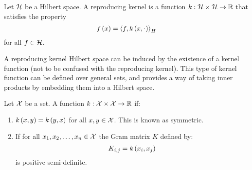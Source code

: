 \documentclass[12pt]{article}
\begin{document}
\begin{definition}
  Let \(\mathcal{H}\) be a Hilbert space.
  A reproducing kernel is a function
  \(k : \mathcal{H} \times \mathcal{H} \to \mathbb{R}\)
  that satisfies the property
  \begin{align*}
    f\left(x\right) = \left\langle f, k\left(x, \cdot\right)\right\rangle_H
  \end{align*}
  for all \(f \in \mathcal{H}\).
\end{definition}

A reproducing kernel Hilbert space can be induced by the existence
of a kernel function (not to be confused with the reproducing kernel).
This type of kernel function can be defined over general sets,
and provides a way of taking inner products by embedding them
into a Hilbert space.

\begin{definition}[Kernel]
  Let \(\mathcal{X}\) be a set.
  A function \(k : \mathcal{X} \times \mathcal{X} \to \mathbb{R}\) if:

  \begin{enumerate}
    \item
      \(k\left(x, y\right) = k\left(y, x\right)\) for all \(x, y \in \mathcal{X}\).
      This is known as symmetric.

    \item
      If for all \(x_1, x_2, \ldots, x_n \in \mathcal{X}\)
      the Gram matrix \(K\)
      defined by:
      \begin{align*}
        K_{i, j} = k\left(x_i, x_j\right)
      \end{align*}
      is positive semi-definite.

  \end{enumerate}

\end{definition}
\end{document}
